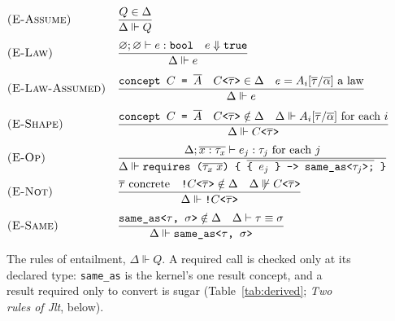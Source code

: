 \begin{figure}[htbp]
\[
\begin{array}{@{}l@{\quad}l@{}}
\textsc{(E-Assume)} & \dfrac{Q \in \Delta}{\Delta \Vdash Q}
\\[12pt]
\textsc{(E-Law)} & \dfrac{\varnothing; \varnothing \vdash e : \texttt{bool} \quad e \Downarrow \texttt{true}}{\Delta \Vdash e}
\\[12pt]
\textsc{(E-Law-Assumed)} & \dfrac{\texttt{concept } C \texttt{ = } \overline{A} \quad C\texttt{<}\overline{\tau}\texttt{>} \in \Delta \quad e = A_i[\overline{\tau}/\overline{\alpha}] \text{ a law}}{\Delta \Vdash e}
\\[12pt]
\textsc{(E-Shape)} & \dfrac{\texttt{concept } C \texttt{ = } \overline{A} \quad C\texttt{<}\overline{\tau}\texttt{>} \notin \Delta \quad \Delta \Vdash A_i[\overline{\tau}/\overline{\alpha}] \text{ for each } i}{\Delta \Vdash C\texttt{<}\overline{\tau}\texttt{>}}
\\[12pt]
\textsc{(E-Op)} & \dfrac{\Delta; \overline{x : \tau_x} \vdash e_j : \tau_j \text{ for each } j}{\Delta \Vdash \texttt{requires (}\overline{\tau_x\; x}\texttt{) \{ }\overline{\texttt{\{ }e_j\texttt{ \} -> same\_as<}\tau_j\texttt{>;}}\texttt{ \}}}
\\[12pt]
\textsc{(E-Not)} & \dfrac{\overline{\tau} \text{ concrete} \quad \texttt{!}C\texttt{<}\overline{\tau}\texttt{>} \notin \Delta \quad \Delta \not\Vdash C\texttt{<}\overline{\tau}\texttt{>}}{\Delta \Vdash \texttt{!}C\texttt{<}\overline{\tau}\texttt{>}}
\\[12pt]
\textsc{(E-Same)} & \dfrac{\texttt{same\_as<}\tau\texttt{, }\sigma\texttt{>} \notin \Delta \quad \Delta \vdash \tau \equiv \sigma}{\Delta \Vdash \texttt{same\_as<}\tau\texttt{, }\sigma\texttt{>}}
\end{array}
\]
\caption{The rules of entailment, $\Delta \Vdash Q$.
A required call is checked only at its declared type: \texttt{same\_as} is the kernel's one result concept, and a result required only to convert is sugar (Table~\ref{tab:derived}; \emph{Two rules of Jlt}, below).}
\label{fig:fjlt-entailment}
\end{figure}

